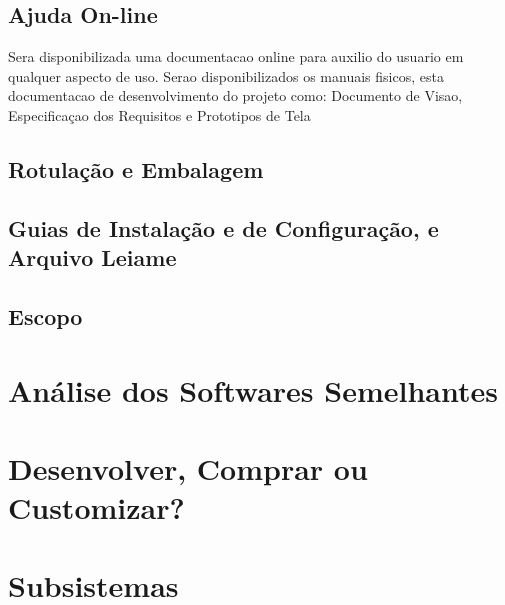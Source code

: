 \subsection{Ajuda On-line}
Sera disponibilizada uma documentacao online para auxilio do usuario em qualquer aspecto de uso. Serao disponibilizados os manuais fisicos, esta documentacao de desenvolvimento do projeto como: Documento de Visao, Especificaçao dos Requisitos e Prototipos de Tela

\subsection{Rotulação e Embalagem}

\subsection{Guias de Instalação e de Configuração, e Arquivo Leiame}

\subsection{Escopo}

\section{Análise dos Softwares Semelhantes}

\section{Desenvolver, Comprar ou Customizar?}

\section{Subsistemas}
